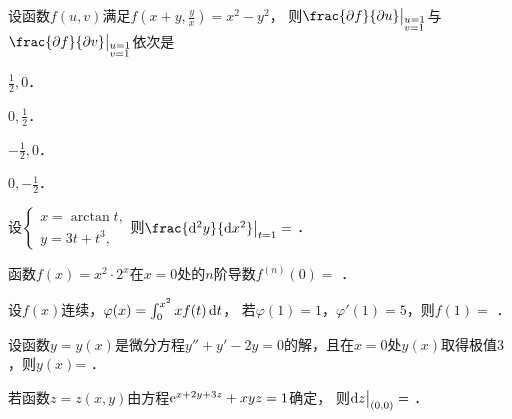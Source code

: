 \documentclass[plain,noanswer,medmath]{../../template/jnuexam}
\begin{document}
\begin{problem}
设函数$f\left(u,v \right)$满足$f\left(x + y,\frac{y}{x}\right) = x^2 - y^2$，
则$\frac{\pdf}{\pdu}\big|_{\begin{subarray}{l}
  u = 1 \\
  v = 1
\end{subarray}}$与$\frac{\pdf}{\pdv}\big|_{\begin{subarray}{l}
  u = 1 \\
  v = 1
\end{subarray}}$依次是\pickout{}
\begin{abcd}
\item $\frac{1}{2},0$．
\item $0,\frac{1}{2}$．
\item $- \frac{1}{2},0$．
\item $0, - \frac{1}{2}$．
\end{abcd}
\end{problem}










\begin{problem}
设$\begin{cases}
  x = \arctan t, \\
  y = 3t + t^3,
\end{cases}$则$\frac{\d^2y}{\dx^2}\big|_{t = 1} =$ \fillin{}．
\end{problem}


\begin{problem}
函数$f(x) = x^2 \cdot 2^x$在$x = 0$处的$n$阶导数$f^{(n)}(0) =$ \fillin{}．
\end{problem}


\begin{problem}
设$f(x)$连续，$\varphi (x) = \int_0^{x^2} x f(t)\mathop{}\!\mathrm{d} t$，
若$\varphi (1) = 1$，$\varphi'(1) = 5$，则$f(1) =$ \fillin{}．
\end{problem}


\begin{problem}
设函数$y = y(x)$是微分方程$y'' + y' - 2y = 0$的解，且在$x = 0$处$y(x)$取得极值$3$，则$y(x)$= \fillin{}．
\end{problem}


\begin{problem}
若函数$z = z(x,y)$由方程$\mathrm{e}^{x + 2y + 3z} + xyz = 1$确定，
则$\mathop{}\!\mathrm{d} z\big|_{(0,0)} =$ \fillin{}．
\end{problem}
\end{document}

